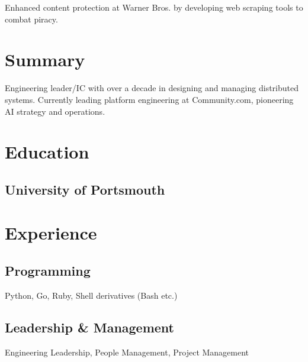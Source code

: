 \documentclass[]{resume}
\begin{document}
\begin{minipage}[t]{0.60\textwidth}
\begin{tightemize}
\item Enhanced content protection at Warner Bros. by developing web scraping tools to combat piracy.
\end{tightemize}
\sectionsep

%
%

\end{minipage}
\hfill
\begin{minipage}[t]{0.33\textwidth}


\section{Summary}
Engineering leader/IC with over a decade in designing and managing distributed systems. Currently leading platform engineering at Community.com, pioneering AI strategy and operations. 
\sectionsep


\section{Education}

\subsection{University of Portsmouth}
\sectionsep


\section{Experience}
\subsection{Programming}
Python, Go, Ruby, Shell derivatives (Bash etc.)
\sectionsep

\subsection{Leadership \& Management}
Engineering Leadership, People Management, Project Management


\end{minipage}
\end{document}
